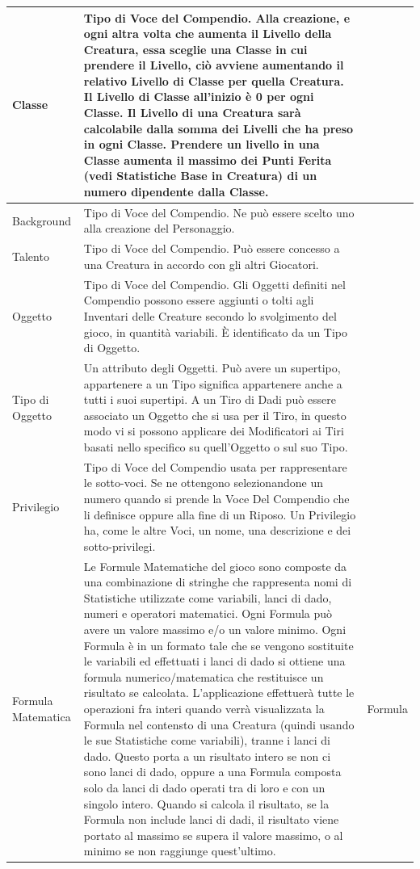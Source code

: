 \documentclass[a4paper, 11pt]{article}
\begin{document}
\begin{center}
\begin{longtable}{ |p{3.5cm}|p{9cm}|p{3cm}|  }
        Classe & Tipo di Voce del Compendio. Alla creazione, e ogni altra volta che aumenta il Livello della Creatura, essa sceglie una Classe in cui prendere il Livello, ciò avviene aumentando il relativo Livello di Classe per quella Creatura. Il Livello di Classe all’inizio è 0 per ogni Classe. Il Livello di una Creatura sarà calcolabile dalla somma dei Livelli che ha preso in ogni Classe. Prendere un livello in una Classe aumenta il massimo dei Punti Ferita (vedi Statistiche Base in Creatura) di un numero dipendente dalla Classe. & \\\hline
        Background & Tipo di Voce del Compendio. Ne può essere scelto uno alla creazione del Personaggio. & \\\hline
        Talento &  Tipo di Voce del Compendio. Può essere concesso a una Creatura in accordo con gli altri Giocatori. & \\\hline
        Oggetto & Tipo di Voce del Compendio. Gli Oggetti definiti nel Compendio possono essere aggiunti o tolti agli Inventari delle Creature secondo lo svolgimento del gioco, in quantità variabili. È identificato da un Tipo di Oggetto. & \\\hline
         Tipo di Oggetto & Un attributo degli Oggetti. Può avere un supertipo, appartenere a un Tipo significa appartenere anche a tutti i suoi supertipi. A un Tiro di Dadi può essere associato un Oggetto che si usa per il Tiro, in questo modo vi si possono applicare dei Modificatori ai Tiri basati nello specifico su quell’Oggetto o sul suo Tipo. & \\\hline
         Privilegio & Tipo di Voce del Compendio usata per rappresentare le sotto-voci. Se ne ottengono selezionandone un numero quando si prende la Voce Del Compendio che li definisce oppure alla fine di un Riposo. Un Privilegio ha, come le altre Voci, un nome, una descrizione e dei sotto-privilegi. & \\\hline
         Formula Matematica & Le Formule Matematiche del gioco sono composte da una combinazione di stringhe che rappresenta nomi di Statistiche utilizzate come variabili, lanci di dado, numeri e operatori matematici. Ogni Formula può avere un valore massimo e/o un valore minimo. Ogni Formula è in un formato tale che se vengono sostituite le variabili ed effettuati i lanci di dado si ottiene una formula numerico/matematica che restituisce un risultato se calcolata. L'applicazione effettuerà tutte le operazioni fra interi quando verrà visualizzata la Formula nel contensto di una Creatura (quindi usando le sue Statistiche come variabili), tranne i lanci di dado. Questo porta a un risultato intero se non ci sono lanci di dado, oppure a una Formula composta solo da lanci di dado operati tra di loro e con un singolo intero. Quando si calcola il risultato, se la Formula non include lanci di dadi, il risultato viene portato al massimo se supera il valore massimo, o al minimo se non raggiunge quest’ultimo. & Formula \\\hline

\end{longtable}
\end{center}
\end{document}
